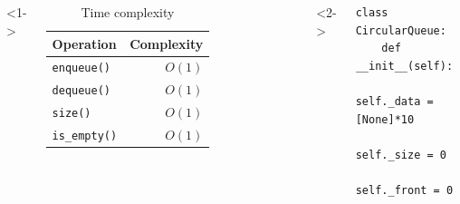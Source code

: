 \documentclass[aspectratio=169, 14pt]{beamer}
\begin{document}
\begin{frame}[fragile]
    \begin{columns}
        <1-> 
        \begin{table}
            \caption{Time complexity}
            \begin{tabular}{lr}
              \toprule
              Operation & Complexity\\
              \midrule
              \texttt{enqueue()} & $O(1)$\\
              \texttt{dequeue()} & $O(1)$ \\
              \texttt{size()} & $O(1)$ \\
              \texttt{is\_empty()} & $O(1)$ \\ 
              \bottomrule
            \end{tabular}
        \end{table} 
        <2->
        \begin{verbatim}
class CircularQueue:
    def __init__(self):
        self._data = [None]*10
        self._size = 0
        self._front = 0
        \end{verbatim}
    \end{columns}
\end{frame}
\end{document}

